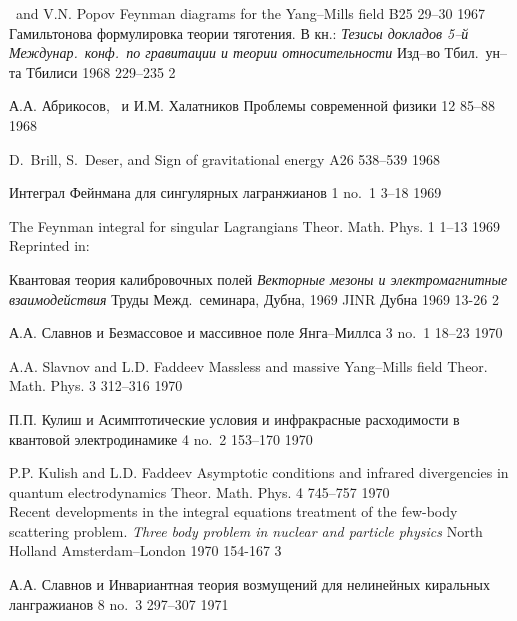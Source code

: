 {\LF\ and V.N. Popov}
{Feynman diagrams for the Yang--Mills field}
{\PL} {B25} {} {29--30} {1967} \\

{\LD}
{Гамильтонова формулировка теории тяготения.}
В кн.: {\em Тезисы докладов 5--й Междунар.\ конф.\ по
 гравитации и теории относительности} {Изд--во Тбил.\ ун--та}
{Тбилиси} {1968} {} {229--235} {2}

{А.А. Абрикосов, \LD\ и И.М. Халатников}
{Проблемы современной физики}
{\VestnikAN} {12} {} {85--88} {1968}

{D.~Brill, S.~Deser, and \LF}
{Sign of gravitational energy}
{\PL} {A26} {} {538--539} {1968}

{\LD}
{Интеграл Фейнмана для сингулярных лагранжианов}
{\TMF} {1} {no.~1} {3--18} {1969}

{\LF}
{The Feynman integral for singular Lagrangians}
{Theor. Math. Phys.} {1} {1--13} {1969} \\

Reprinted in: 

{\LD} 
{Квантовая теория калибровочных полей} 
{\em Векторные мезоны и электромагнитные взаимодействия}
{Труды Межд.\ семинара, Дубна, 1969} {JINR} {Дубна} {1969} {} {13-26} {2}

{А.А. Славнов и \LD}
{Безмассовое и массивное поле Янга--Миллса}
{\TMF} {3} {no.~1} {18--23} {1970}

{A.A. Slavnov and L.D. Faddeev}
{Massless and massive Yang--Mills field}
{Theor. Math. Phys.} {3} {312--316} {1970}

{П.П. Кулиш и \LD}
{Асимптотические условия и инфракрасные расходимости в квантовой электродинамике}
{\TMF} {4} {no.~2} {153--170} {1970}

{P.P. Kulish and L.D. Faddeev}
{Asymptotic conditions and infrared divergencies in
 quantum electrodynamics}
{Theor. Math. Phys.} {4} {745--757} {1970} \\

{\LF}
{Recent developments in the integral equations treatment of the
 few-body scattering problem.} 
{\em Three body problem in nuclear and particle physics}
{North Holland} {Amsterdam--London} {1970} {154-167} {3}

{А.А. Славнов и \LD}
{Инвариантная теория возмущений для нелинейных киральных лангражианов}
{\TMF} {8} {no.~3} {297--307} {1971}

